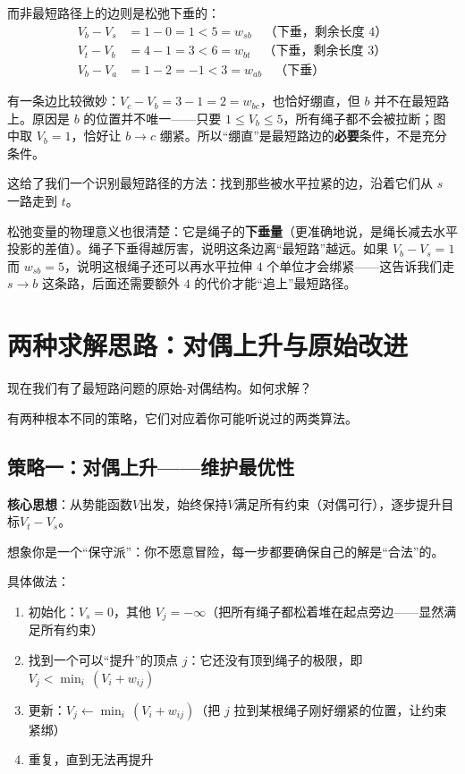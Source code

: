 而非最短路径上的边则是松弛下垂的：
\begin{align*}
    V_b - V_s &= 1 - 0 = 1 < 5 = w_{sb} \quad \text{（下垂，剩余长度 $4$）} \\
    V_t - V_b &= 4 - 1 = 3 < 6 = w_{bt} \quad \text{（下垂，剩余长度 $3$）} \\
    V_b - V_a &= 1 - 2 = -1 < 3 = w_{ab} \quad \text{（下垂）}
\end{align*}

有一条边比较微妙：$V_c - V_b = 3 - 1 = 2 = w_{bc}$，也恰好绷直，但 $b$ 并不在最短路上。原因是 $b$ 的位置并不唯一——只要 $1 \le V_b \le 5$，所有绳子都不会被拉断；图中取 $V_b = 1$，恰好让 $b \to c$ 绷紧。所以“绷直”是最短路边的\textbf{必要}条件，不是充分条件。

这给了我们一个识别最短路径的方法：找到那些被水平拉紧的边，沿着它们从 $s$ 一路走到 $t$。

\begin{remark}
松弛变量的物理意义也很清楚：它是绳子的\textbf{下垂量}（更准确地说，是绳长减去水平投影的差值）。绳子下垂得越厉害，说明这条边离“最短路”越远。如果 $V_b - V_s = 1$ 而 $w_{sb} = 5$，说明这根绳子还可以再水平拉伸 $4$ 个单位才会绑紧——这告诉我们走 $s \to b$ 这条路，后面还需要额外 $4$ 的代价才能“追上”最短路径。
\end{remark}
\section{两种求解思路：对偶上升与原始改进}

现在我们有了最短路问题的原始-对偶结构。如何求解？

有两种根本不同的策略，它们对应着你可能听说过的两类算法。

\subsection{策略一：对偶上升——维护最优性}

\textbf{核心思想}：从势能函数$V$出发，始终保持$V$满足所有约束（对偶可行），逐步提升目标$V_t - V_s$。

想象你是一个“保守派”：你不愿意冒险，每一步都要确保自己的解是“合法”的。

具体做法：
\begin{enumerate}
    \item 初始化：$V_s = 0$，其他 $V_j = -\infty$（把所有绳子都松着堆在起点旁边——显然满足所有约束）
    \item 找到一个可以“提升”的顶点 $j$：它还没有顶到绳子的极限，即 $V_j < \min_i\,(V_i + w_{ij})$
    \item 更新：$V_j \leftarrow \min_i\,(V_i + w_{ij})$（把 $j$ 拉到某根绳子刚好绷紧的位置，让约束紧绑）
    \item 重复，直到无法再提升
\end{enumerate}

